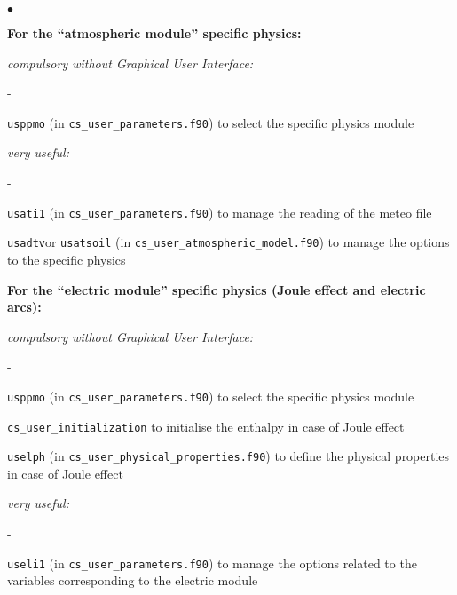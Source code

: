 {{{\begin{list}{$\bullet$}{}
\begin{list}{}{}
     \item{\bf For the ``atmospheric module'' specific physics:}

    \begin{list}{}{}
       \item {\em compulsory without Graphical User Interface:}
        \begin{list}{-}{}
            \item \texttt{usppmo} (in \texttt{cs\_user\_parameters.f90}) 
                  to select the specific physics module
        \end{list}

        \item {\em very useful:}
        \begin{list}{-}{}
            \item  \texttt{usati1} (in \texttt{cs\_user\_parameters.f90}) 
                   to manage the reading of the meteo file
           \item  \texttt{usadtv}or \texttt{usatsoil} (in \texttt{cs\_user\_atmospheric\_model.f90})
                   to manage the options to the specific physics

        \end{list}
    \end{list}


     \item{\bf For the ``electric module'' specific physics
      (Joule effect and electric arcs):}

    \begin{list}{}{}
       \item {\em compulsory without Graphical User Interface:}
        \begin{list}{-}{}
            \item \texttt{usppmo} (in \texttt{cs\_user\_parameters.f90}) 
                  to select the specific physics module

            \item \texttt{cs\_user\_initialization} to initialise the enthalpy in
                  case of Joule effect

            \item \texttt{uselph} (in \texttt{cs\_user\_physical\_properties.f90})
                  to define the physical
                  properties in case of Joule effect
        \end{list}

        \item {\em very useful:}
        \begin{list}{-}{}
            \item  \texttt{useli1} (in \texttt{cs\_user\_parameters.f90}) 
                   to manage the options related
                   to the variables corresponding to the electric module


\end{list}
\end{list}
\end{list}
\end{list}}}}

